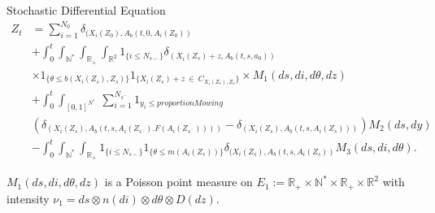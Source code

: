 \documentclass{myBeamer}
\newcommand{\N}{\mathbb N}%
\newcommand{\R}{\mathbb R}%
\begin{document}
\begin{frame}{Stochastic Differential Equation}
\begin{align*}
\label{equation_sto} 
 Z_t & =  \sum_{i=1}^{N_0} \delta_{( X_i(Z_0) , A_b(t,0,A_i(Z_0) )} \\
 & +  \int_0^t \int_{\N^*} \int_{\R_+} \int_{\R^2}  1_{ \{  i \leq  N_{s-}  \} } \delta _{( X_i(Z_s)+z , A_b(t,s, a_0 ) ) } \\ 
& \times   1_{ \{  \theta \leq b(X_i(Z_s), Z_s ) \} }   1_{ \{ X_i(Z_s) + z ~ \in ~ C_{X_i(Z_s),Z_s} \} } \times M_1(ds,di,d\theta,dz) \\ 
& +  \int_0^t \int_{[0,1]^{N^*}}  ~ \sum_{i=1}^{N_{s^-}}  1_{ y_i \leq proportionMowing } ~\\
&( \delta_{( X_i(Z_s) , A_b(t,s,A_i(Z_{s^-}).F(A_i(Z_{s^-}) ) ))} -  \delta_{( X_i(Z_s) , A_b(t,s,A_i(Z_s)) )} )   M_2(ds,dy)  \\
&- \int_0^t \int_{\N^*} \int_{\R_+}  1_{ \{  i \leq  N_{s-}   \} }   1_{ \{  \theta \leq m( A_i(Z_s) ) \} }  \delta _{( X_i(Z_s) , A_b(t,s,A_i(Z_s) ) } M_3(ds,di,d\theta). 
\end{align*}

\small{$M_1(ds,di,d\theta,dz)$ is a Poisson point measure on $E_1:= \R_+ \times \N^* \times \R_+ \times  \R^2 $  with intensity $ \nu_1 = ds \otimes n(di)  \otimes d\theta \otimes  D(dz) $. }
\end{frame}
\end{document}
